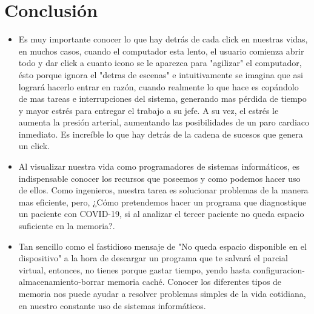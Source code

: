 \documentclass{article}
\begin{document}
\vspace{10.5cm}



\section{Conclusión} \label{conclulsion}
\begin{itemize}
    \item 
    Es muy importante conocer lo que hay detrás de cada click en nuestras vidas, en muchos casos, cuando el computador esta lento, el usuario comienza abrir todo y dar click a cuanto icono se le aparezca para "agilizar" el computador, ésto porque ignora el "detras de escenas" e intuitivamente se imagina que asi logrará hacerlo entrar en razón, cuando realmente lo que hace es copándolo de mas tareas e interrupciones del sistema, generando mas pérdida de tiempo y mayor estrés para entregar el trabajo a su jefe. A su vez, el estrés le aumenta la presión arterial, aumentando las posibilidades de un paro cardiaco inmediato. Es increíble lo que hay detrás de la cadena de sucesos que genera un click.
    \item
    Al visualizar nuestra vida como programadores de sistemas informáticos, es indispensable conocer los recursos que poseemos y como podemos hacer uso de ellos. Como ingenieros, nuestra tarea es solucionar problemas de la manera mas eficiente, pero, ¿Cómo pretendemos hacer un programa que diagnostique un paciente con COVID-19, si al analizar el tercer paciente no queda espacio suficiente en la memoria?.
    \item
    Tan sencillo como el fastidioso mensaje de "No queda espacio disponible en el dispositivo" a la hora de descargar un programa que te salvará el parcial virtual, entonces, no tienes porque gastar tiempo, yendo hasta configuracion-almacenamiento-borrar memoria caché. Conocer los diferentes tipos de memoria nos puede ayudar a resolver problemas simples de la vida cotidiana, en nuestro constante uso de sistemas informáticos.
    
\end{itemize}




\end{document}
